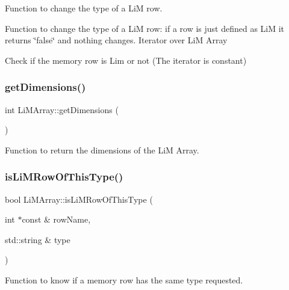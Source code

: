 Function to change the type of a LiM row. 

Function to change the type of a LiM row\+: if a row is just defined as LiM it returns \char`\"{}false\char`\"{} and nothing changes. Iterator over LiM Array

Check if the memory row is Lim or not (The iterator is constant) \mbox{\label{classoctantis_1_1LiMArray_ac73a80ad67e747b43662ef149518509b}} 
\subsubsection{\texorpdfstring{get\+Dimensions()}{getDimensions()}}
{\footnotesize\ttfamily int Li\+M\+Array\+::get\+Dimensions (\begin{DoxyParamCaption}{ }\end{DoxyParamCaption})}



Function to return the dimensions of the LiM Array. 

\mbox{\label{classoctantis_1_1LiMArray_ac52cead51baeecbb4cefe4c9ee88ea21}} 
\subsubsection{\texorpdfstring{is\+Li\+M\+Row\+Of\+This\+Type()}{isLiMRowOfThisType()}}
{\footnotesize\ttfamily bool Li\+M\+Array\+::is\+Li\+M\+Row\+Of\+This\+Type (\begin{DoxyParamCaption}\item[{int $\ast$const \&}]{row\+Name,  }\item[{std\+::string \&}]{type }\end{DoxyParamCaption})}



Function to know if a memory row has the same type requested. 

\mbox{\label{classoctantis_1_1LiMArray_aa5bcb2c9f79bc52d594714f67b139657}} 
